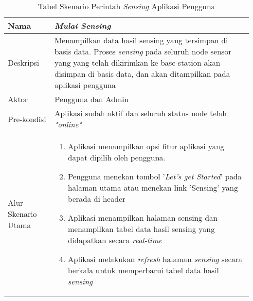     
     \begin{table}[H]
        \centering
        \caption{Tabel Skenario Perintah \textit{Sensing} Aplikasi Pengguna}
        \begin{tabular}{|p{3cm}|p{10cm}|}
        \hline
            Nama & \textit{Mulai Sensing}\\
        \hline 
        \hline
            Deskripsi & Menampilkan data hasil sensing yang tersimpan di basis data. Proses \textit{sensing} pada seluruh node sensor yang yang telah dikirimkan ke base-station akan disimpan di basis data, dan akan ditampilkan pada aplikasi pengguna\\
        \hline
            Aktor & Pengguna dan Admin \\
        \hline
            Pre-kondisi & Aplikasi sudah aktif dan seluruh status node telah \textit{"online"}\\
        \hline
            Alur Skenario Utama & 
             \begin{enumerate}
                \item Aplikasi menampilkan opsi fitur aplikasi yang dapat dipilih oleh pengguna.
                \item Pengguna menekan tombol '\textit{Let's get Started}' pada halaman utama atau menekan link 'Sensing' yang berada di header
                \item Aplikasi menampilkan halaman sensing dan menampilkan tabel data hasil sensing yang didapatkan secara \textit{real-time}
                \item Aplikasi melakukan \textit{refresh} halaman \textit{sensing} secara berkala untuk memperbarui tabel data hasil \textit{sensing}
            \end{enumerate}\\
        \hline
        \end{tabular}
        \label{tab:skenario4}
    \end{table}
    
